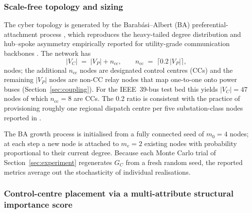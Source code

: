 \subsubsection{Scale-free topology and sizing}\label{sec:topology}

The cyber topology is generated by the Barab\'asi--Albert (BA)
preferential-attachment process \citep{BarabasiAlbert1999}, which
reproduces the heavy-tailed degree distribution and hub--spoke
asymmetry empirically reported for utility-grade communication
backbones \citep{Pagani2013}.  The network has
\begin{equation}\label{eq:cyber_size}
  |V_C| \;=\; |V_P| + n_{\text{cc}},
  \qquad
  n_{\text{cc}} \;=\; \lceil 0.2\,|V_P|\rceil,
\end{equation}
nodes; the additional $n_{\text{cc}}$ nodes are designated control
centres (CCs) and the remaining $|V_P|$ nodes are non-CC relay nodes
that map one-to-one onto power buses (Section~\ref{sec:coupling}).
For the IEEE~39-bus test bed this yields $|V_C|=47$ nodes of which
$n_{\text{cc}}=8$ are CCs.  The 0.2 ratio is consistent with the
practice of provisioning roughly one regional dispatch centre per
five substation-class nodes reported in
\citep{NASPI_LatencyGuidelines}.

The BA growth process is initialised from a fully connected seed of
$m_0=4$ nodes; at each step a new node is attached to $m_e=2$
existing nodes with probability proportional to their current
degree.  Because each Monte Carlo trial of
Section~\ref{sec:experiment} regenerates $G_C$ from a fresh random
seed, the reported metrics average out the stochasticity of
individual realisations.

\subsubsection{Control-centre placement via a multi-attribute
structural importance score}\label{sec:msis}

